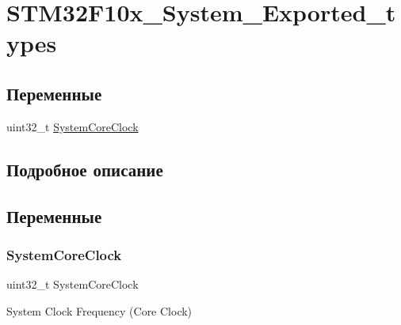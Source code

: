 \hypertarget{group___s_t_m32_f10x___system___exported__types}{}\section{S\+T\+M32\+F10x\+\_\+\+System\+\_\+\+Exported\+\_\+types}
\label{group___s_t_m32_f10x___system___exported__types}
\subsection*{Переменные}
\begin{DoxyCompactItemize}
\item 
uint32\+\_\+t \mbox{\hyperlink{group___s_t_m32_f10x___system___exported__types_gaa3cd3e43291e81e795d642b79b6088e6}{System\+Core\+Clock}}
\end{DoxyCompactItemize}


\subsection{Подробное описание}


\subsection{Переменные}
\mbox{\label{group___s_t_m32_f10x___system___exported__types_gaa3cd3e43291e81e795d642b79b6088e6}} 
\subsubsection{\texorpdfstring{SystemCoreClock}{SystemCoreClock}}
{\footnotesize\ttfamily uint32\+\_\+t System\+Core\+Clock}

System Clock Frequency (Core Clock) 